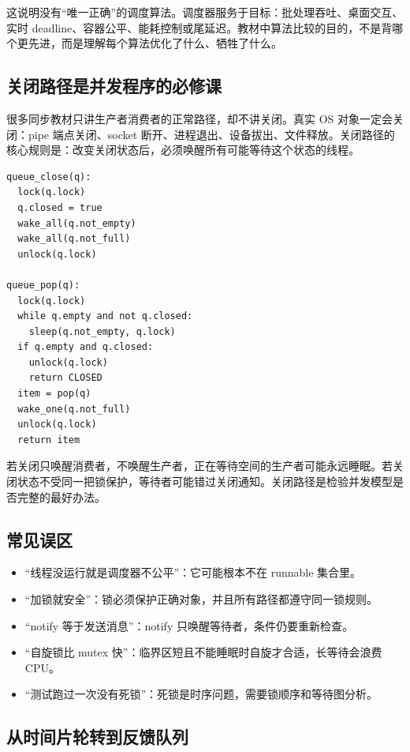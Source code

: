 这说明没有“唯一正确”的调度算法。调度器服务于目标：批处理吞吐、桌面交互、实时 deadline、容器公平、能耗控制或尾延迟。教材中算法比较的目的，不是背哪个更先进，而是理解每个算法优化了什么、牺牲了什么。

\subsection{关闭路径是并发程序的必修课}

很多同步教材只讲生产者消费者的正常路径，却不讲关闭。真实 OS 对象一定会关闭：pipe 端点关闭、socket 断开、进程退出、设备拔出、文件释放。关闭路径的核心规则是：改变关闭状态后，必须唤醒所有可能等待这个状态的线程。

\begin{lstlisting}
queue_close(q):
  lock(q.lock)
  q.closed = true
  wake_all(q.not_empty)
  wake_all(q.not_full)
  unlock(q.lock)

queue_pop(q):
  lock(q.lock)
  while q.empty and not q.closed:
    sleep(q.not_empty, q.lock)
  if q.empty and q.closed:
    unlock(q.lock)
    return CLOSED
  item = pop(q)
  wake_one(q.not_full)
  unlock(q.lock)
  return item
\end{lstlisting}

若关闭只唤醒消费者，不唤醒生产者，正在等待空间的生产者可能永远睡眠。若关闭状态不受同一把锁保护，等待者可能错过关闭通知。关闭路径是检验并发模型是否完整的最好办法。

\subsection{常见误区}

\begin{warningbox}
\begin{itemize}
\tightlist
\item “线程没运行就是调度器不公平”：它可能根本不在 runnable 集合里。
\item “加锁就安全”：锁必须保护正确对象，并且所有路径都遵守同一锁规则。
\item “notify 等于发送消息”：notify 只唤醒等待者，条件仍要重新检查。
\item “自旋锁比 mutex 快”：临界区短且不能睡眠时自旋才合适，长等待会浪费 CPU。
\item “测试跑过一次没有死锁”：死锁是时序问题，需要锁顺序和等待图分析。
\end{itemize}
\end{warningbox}

\subsection{从时间片轮转到反馈队列}

